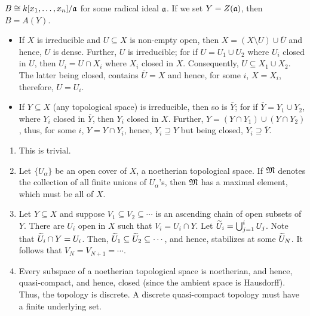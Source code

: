 \begin{exercise}
    $B\cong k[x_1,\dots, x_n]/\mathfrak{a}$ for some radical ideal $\mathfrak{a}$. If we set $Y = Z(\mathfrak{a})$, then $B = A(Y)$.
\end{exercise}

\begin{exercise}
\begin{itemize}
    \item If $X$ is irreducible and $U\subseteq X$ is non-empty open, then $X = (X\setminus U)\cup \overline U$ and hence, $U$ is dense. Further, $U$ is irreducible; for if $U = U_1\cup U_2$ where $U_i$ closed in $U$, then $U_i = U\cap X_i$ where $X_i$ closed in $X$. Consequently, $U\subseteq X_1\cup X_2$. The latter being closed, contains $\overline U = X$ and hence, for some $i$, $X = X_i$, therefore, $U = U_i$.

    \item If $Y\subseteq X$ (any topological space) is irreducible, then so is $\overline Y$; for if $\overline Y = Y_1\cup Y_2$, where $Y_i$ closed in $\overline Y$, then $Y_i$ closed in $X$. Further, $Y = (Y\cap Y_1)\cup (Y\cap Y_2)$, thus, for some $i$, $Y = Y\cap Y_i$, hence, $Y_i\supseteq Y$ but being closed, $Y_i\supseteq\overline Y$.
\end{itemize}
\end{exercise}

\begin{exercise}
\begin{enumerate}[label=(\alph*)]
    \item This is trivial. 
    \item Let $\{U_\alpha\}$ be an open cover of $X$, a noetherian topological space. If $\mathfrak{M}$ denotes the collection of all finite unions of $U_\alpha$'s, then $\mathfrak{M}$ has a maximal element, which must be all of $X$. 
    \item Let $Y\subseteq X$ and suppose $V_1\subseteq V_2\subseteq\cdots$ is an ascending chain of open subsets of $Y$. There are $U_i$ open in $X$ such that $V_i = U_i\cap Y$. Let $\widetilde{U}_i = \bigcup_{j = 1}^i U_j$. Note that $\widetilde{U}_i\cap Y = U_i$. Then, $\widetilde{U}_1\subseteq \widetilde{U}_2\subseteq\cdots$, and hence, stabilizes at some $\widetilde{U}_N$. It follows that $V_N = V_{N + 1} = \cdots$.
    \item Every subspace of a noetherian topological space is noetherian, and hence, quasi-compact, and hence, closed (since the ambient space is Hausdorff). Thus, the topology is discrete. A discrete quasi-compact topology must have a finite underlying set.
\end{enumerate}
\end{exercise}

